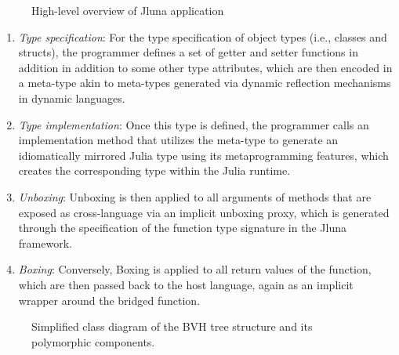 \begin{figure}[ht!]
  \centering
  
  \caption{High-level overview of Jluna application}
  \label{fig:jluna_high_level_impl}
  \Description{}
\end{figure}

\begin{enumerate}
  \item \textit{Type specification}: For the type specification of object types (i.e., classes and structs), the programmer defines a set of getter and setter functions in addition in addition to some other type attributes, which are then encoded in a meta-type akin to meta-types generated via dynamic reflection mechanisms in dynamic languages.
  \item \textit{Type implementation}: Once this type is defined, the programmer calls an implementation method that utilizes the meta-type to generate an idiomatically mirrored Julia type using its metaprogramming features, which creates the corresponding type within the Julia runtime.
  \item \textit{Unboxing}: Unboxing is then applied to all arguments of methods that are exposed as cross-language via an implicit unboxing proxy, which is generated through the specification of the function type signature in the Jluna framework.
  \item \textit{Boxing}: Conversely, Boxing is applied to all return values of the function, which are then passed back to the host language, again as an implicit wrapper around the bridged function.
\end{enumerate}

\begin{figure}[ht!]
  \centering
  \caption{Simplified class diagram of the BVH tree structure and its polymorphic components.}
  \label{fig:bvh_class_diagram}
\end{figure}

